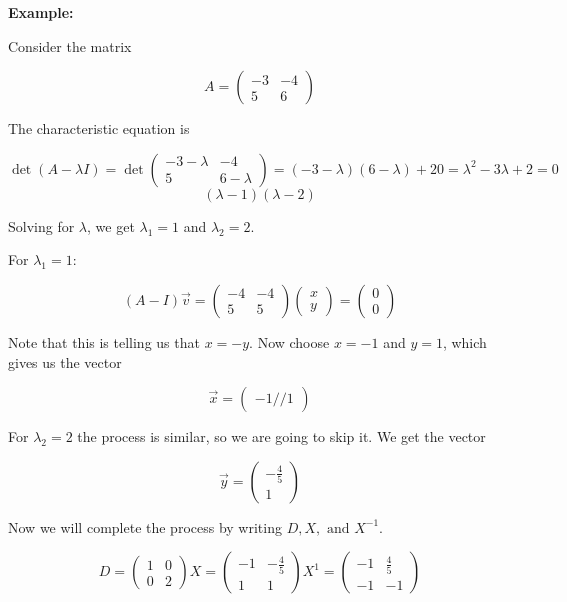 \textbf{Example: }
\vspace{\baselineskip}

Consider the matrix

\[
    A = \begin{pmatrix}
    -3 & -4 \\
    5 & 6
    \end{pmatrix}
\]


The characteristic equation is

\[
    \det(A - \lambda I) 
    = \det 
    \begin{pmatrix}
            -3 - \lambda & -4 \\
        5 & 6 - \lambda
    \end{pmatrix} 
    = (-3 - \lambda)(6 - \lambda) + 20 = \lambda^2 - 3\lambda + 2 = 0    
\]
\[
    (\lambda - 1)(\lambda - 2)
\]

Solving for \(\lambda\), we get \(\lambda_1 = 1\) and \(\lambda_2 = 2\).
\vspace{\baselineskip}

For \(\lambda_1 = 1\):

\[
   (A - I)\vec{v} = \begin{pmatrix}
    -4 & -4 \\
    5 & 5
    \end{pmatrix} \begin{pmatrix}
    x \\
    y
    \end{pmatrix} = \begin{pmatrix}
    0 \\
    0
    \end{pmatrix}
\]

Note that this is telling us that \(x = -y\). Now choose \(x = -1\) and \(y = 1\), which gives us 
the vector 

\[
    \vec{x} = \begin{pmatrix}
        -1 // 1
    \end{pmatrix}
\]

For \(\lambda_2 = 2\) the process is similar, so we are going to skip it. We get the vector

\[
    \vec{y} = \begin{pmatrix}
        -\frac{4}{5} \\ 1
    \end{pmatrix}
\]

Now we will complete the process by writing \(D, X, \text{ and } X^{-1}\).

\[
    D = \begin{pmatrix}
        1 & 0 \\
        0 & 2
    \end{pmatrix}
    X = \begin{pmatrix}
        -1  & -\frac{4}{5} \\
        1   &   1 
    \end{pmatrix}
    X^{1} = \begin{pmatrix}
        -1  & \frac{4}{5} \\
        -1   &   -1 
    \end{pmatrix}
\]

